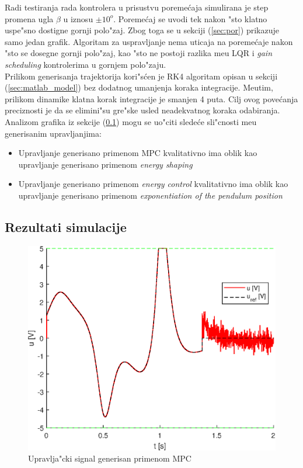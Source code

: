\documentclass[a4paper,11pt]{article}
\theoremstyle{definition} \newtheorem{deff}{Definicija}[section]
\theoremstyle{definition} \newtheorem{prim}[deff]{Primer}
\theoremstyle{plain} \newtheorem{teor}[deff]{Teorema}
\begin{document}
	Radi testiranja rada kontrolera u prisustvu poreme\'caja simulirana je step promena ugla $\beta$ u iznosu $\pm10^o$. Poreme\'caj se uvodi tek nakon "sto klatno uspe"sno dostigne gornji polo"zaj. Zbog toga se u sekciji (\ref{sec:por}) prikazuje samo jedan grafik. Algoritam za uspravljanje nema uticaja na poreme\'caje nakon "sto se dosegne gornji polo"zaj, kao "sto ne postoji razlika me\dj u LQR i \emph{gain scheduling} kontrolerima u gornjem polo"zaju.\\
	
	Prilikom generisanja trajektorija kori"s\'cen je RK4 algoritam opisan u sekciji (\ref{sec:matlab_model}) bez dodatnog umanjenja koraka integracije. Me\dj utim, prilikom dinamike klatna korak integracije je smanjen 4 puta. Cilj ovog pove\'canja preciznosti je da se elimini"su gre"ske usled neadekvatnog koraka odabiranja. \\
	
	Analizom grafika iz sekcije (\ref{sec:grafici}) mogu se uo"citi slede\'ce sli"cnosti me\dj u generisanim upravljanjima:
	\begin{itemize}
		\item Upravljanje generisano primenom MPC kvalitativno ima oblik kao upravljanje generisano primenom \emph{energy shaping}
		\item Upravljanje generisano primenom \emph{energy control} kvalitativno ima oblik kao upravljanje generisano primenom \emph{exponentiation of the pendulum position}
	\end{itemize} 
	
	
	
	
	
	
	
	
	
	
	
	
	
	
	
	\clearpage
	\subsection{Rezultati simulacije} \label{sec:grafici}
	\begin{figure}[!h]
		\centering
		\includegraphics[width=0.6\linewidth]{slike/Control_MPC_trajectory_norm2.eps}
		\caption{Upravlja"cki signal generisan primenom MPC}
		\label{fig:cntrl_MPC}
	\end{figure}
	
\end{document}
